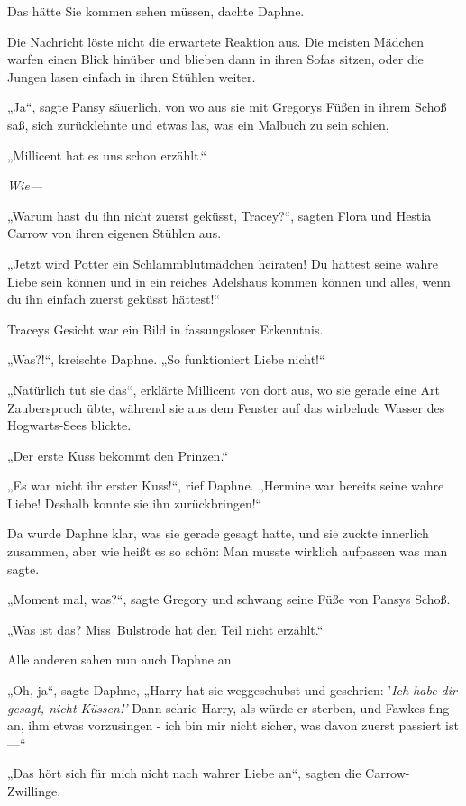 {Das hätte Sie kommen sehen müssen, dachte Daphne.

Die Nachricht löste nicht die erwartete Reaktion aus. Die meisten Mädchen warfen einen Blick hinüber und blieben dann in ihren Sofas sitzen, oder die Jungen lasen einfach in ihren Stühlen weiter.

„Ja“, sagte Pansy säuerlich, von wo aus sie mit Gregorys Füßen in ihrem Schoß saß, sich zurücklehnte und etwas las, was ein Malbuch zu sein schien,

„Millicent hat es uns schon erzählt.“

\emph{Wie—}

„Warum hast du ihn nicht zuerst geküsst, Tracey?“, sagten Flora und Hestia Carrow von ihren eigenen Stühlen aus.

„Jetzt wird Potter ein Schlammblutmädchen heiraten! Du hättest seine wahre Liebe sein können und in ein reiches Adelshaus kommen können und alles, wenn du ihn einfach zuerst geküsst hättest!“

Traceys Gesicht war ein Bild in fassungsloser Erkenntnis.

„Was?!“, kreischte Daphne. „So funktioniert Liebe nicht!“

„Natürlich tut sie das“, erklärte Millicent von dort aus, wo sie gerade eine Art Zauberspruch übte, während sie aus dem Fenster auf das wirbelnde Wasser des Hogwarts-Sees blickte.

„Der erste Kuss bekommt den Prinzen.“

„Es war nicht ihr erster Kuss!“, rief Daphne. „Hermine war bereits seine wahre Liebe! Deshalb konnte sie ihn zurückbringen!“

Da wurde Daphne klar, was sie gerade gesagt hatte, und sie zuckte innerlich zusammen, aber wie heißt es so schön: Man musste wirklich aufpassen was man sagte.

„Moment mal, was?“, sagte Gregory und schwang seine Füße von Pansys Schoß.

„Was ist das? Miss~Bulstrode hat den Teil nicht erzählt.“

Alle anderen sahen nun auch Daphne an.

„Oh, ja“, sagte Daphne, „Harry hat sie weggeschubst und geschrien: '\emph{Ich habe dir gesagt, nicht Küssen!'} Dann schrie Harry, als würde er sterben, und Fawkes fing an, ihm etwas vorzusingen - ich bin mir nicht sicher, was davon zuerst passiert ist—“

„Das hört sich für mich nicht nach wahrer Liebe an“, sagten die Carrow-Zwillinge.

}
